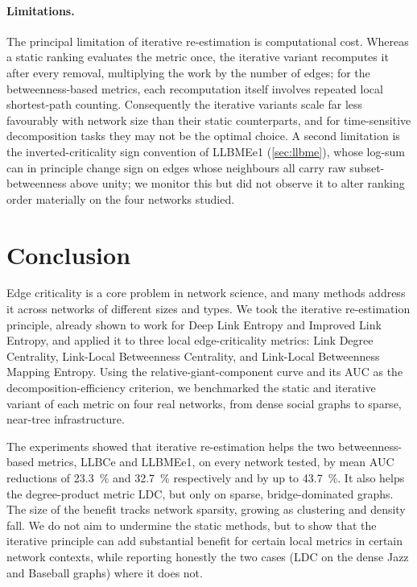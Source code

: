\documentclass[runningheads,11pt]{article}
\begin{document}
\paragraph{Limitations.}
The principal limitation of iterative re-estimation is computational cost.
Whereas a static ranking evaluates the metric once, the iterative variant
recomputes it after every removal, multiplying the work by the number of edges;
for the betweenness-based metrics, each recomputation itself involves repeated
local shortest-path counting. Consequently the iterative variants scale far less
favourably with network size than their static counterparts, and for
time-sensitive decomposition tasks they may not be the optimal choice. A second
limitation is the inverted-criticality sign convention of LLBMEe1
(\cref{sec:llbme}), whose log-sum can in principle change sign on edges whose
neighbours all carry raw subset-betweenness above unity; we monitor this but did
not observe it to alter ranking order materially on the four networks studied.

\section{Conclusion}
\label{sec:conclusion}
Edge criticality is a core problem in network science, and many methods address
it across networks of different sizes and types. We took the iterative
re-estimation principle, already shown to work for Deep Link Entropy and Improved
Link Entropy, and applied it to three local edge-criticality metrics: Link Degree
Centrality, Link-Local Betweenness Centrality, and Link-Local Betweenness Mapping
Entropy. Using the relative-giant-component curve and its AUC as the
decomposition-efficiency criterion, we benchmarked the static and iterative
variant of each metric on four real networks, from dense social graphs to sparse,
near-tree infrastructure.

The experiments showed that iterative re-estimation helps the two
betweenness-based metrics, LLBCe and LLBMEe1, on every network tested, by mean
AUC reductions of \SI{23.3}{\percent} and \SI{32.7}{\percent} respectively and by
up to \SI{43.7}{\percent}. It also helps the degree-product metric LDC, but only
on sparse, bridge-dominated graphs. The size of the benefit tracks network
sparsity, growing as clustering and density fall. We do not aim to undermine the
static methods, but to show that the iterative principle can add substantial
benefit for certain local metrics in certain network contexts, while reporting
honestly the two cases (LDC on the dense Jazz and Baseball graphs) where it does
not.
\end{document}
